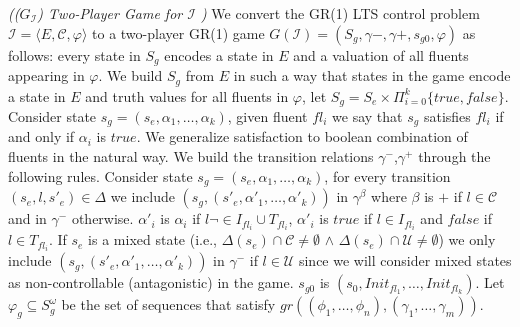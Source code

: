 \begin{definition}\label{def:lts-2-game}\emph{(($G_{\mathcal{I}}$) Two-Player Game for $\mathcal{I}$ )}
We convert the GR(1) LTS control problem $\mathcal{I}=\langle E, \mathcal{C}, \varphi \rangle$ to a two-player GR(1) game $G (\mathcal{I})=(S_{g},\gamma{-},\gamma{+},s_{g0},\varphi)$ as follows: every state in $S_{g}$ encodes a state in $E$ and a valuation of all fluents
appearing in $\varphi$. We build $S_g$ from $E$ in such a way that states in the game encode a state in $E$ and truth values for all fluents in $\varphi$, let $S_g = S_e \times \Pi_{i=0}^{k}\{true,false\}$.  Consider state $s_g=(s_e,\alpha_1,\ldots,\alpha_k)$, given fluent $fl_i$ we say that $s_g$ satisfies $fl_i$ if and only if $\alpha_i$ is $true$. We generalize satisfaction to boolean combination of fluents in the natural way.  We build the transition relations $\gamma^{-}$,$\gamma^{+}$ through the following rules.  Consider state $s_g=(s_e,\alpha_1,\ldots,\alpha_k)$, for every transition $(s_e,l,s'_e) \in \Delta$ we include $(s_g,(s'_e,\alpha'_1,\ldots,\alpha'_k))$ in $\gamma^{\beta}$ where
$\beta$ is $+$ if $l \in \mathcal{C}$ and in $\gamma^{-}$ otherwise.
$\alpha'_i$ is $\alpha_i$ if $l \neg\in I_{fl_i} \cup T_{fl_i}$, $\alpha'_i$ is $true$ if $l \in I_{fl_i}$ and $false$ if $l \in T_{fl_i}$.  
If $s_e$ is a mixed state (i.e., $\Delta(s_e) \cap \mathcal{C} \neq \emptyset$
$\wedge$
$\Delta(s_e) \cap \mathcal{U} \neq \emptyset$) we only include
$(s_g, (s'_e,\alpha'_1,\ldots,\alpha'_k))$ in $\gamma^{-}$
if $l \in \mathcal{U}$ since we will consider mixed states as 
non-controllable (antagonistic) in the game.
$s_{g0}$ is $(s_0, Init_{fl_1},\ldots, Init_{fl_k})$.
Let $\varphi_g \subseteq S_g^{\omega}$ be the set of sequences that satisfy $gr((\phi_1,\ldots,\phi_n),(\gamma_1,\ldots,\gamma_m))$.
\end{definition}



